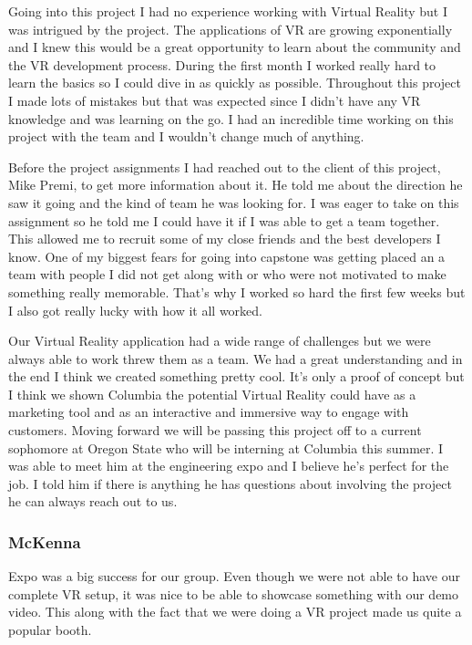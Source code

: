 \documentclass[10pt,journal,compsoc,onecolumn, draftclsnofoot]{IEEEtran}
\begin{document}
Going into this project I had no experience working with Virtual Reality but I was intrigued by the project. The applications of VR are growing exponentially and I knew this would be a great opportunity to learn about the community and the VR development process. During the first month I worked really hard to learn the basics so I could dive in as quickly as possible. Throughout this project I made lots of mistakes but that was expected since I didn't have any VR knowledge and was learning on the go. I had an incredible time working on this project with the team and I wouldn't change much of anything.

Before the project assignments I had reached out to the client of this project, Mike Premi, to get more information about it. He told me about the direction he saw it going and the kind of team he was looking for. I was eager to take on this assignment so he told me I could have it if I was able to get a team together. This allowed me to recruit some of my close friends and the best developers I know. One of my biggest fears for going into capstone was getting placed an a team with people I did not get along with or who were not motivated to make something really memorable. That's why I worked so hard the first few weeks but I also got really lucky with how it all worked.

Our Virtual Reality application had a wide range of challenges but we were always able to work threw them as a team. We had a great understanding and in the end I think we created something pretty cool. It's only a proof of concept but I think we shown Columbia the potential Virtual Reality could have as a marketing tool and as an interactive and immersive way to engage with customers. Moving forward we will be passing this project off to a current sophomore at Oregon State who will be interning at Columbia this summer. I was able to meet him at the engineering expo and I believe he's perfect for the job. I told him if there is anything he has questions about involving the project he can always reach out to us.

\subsubsection{McKenna}

Expo was a big success for our group. Even though we were not able to have our complete VR setup, it was nice to be able to showcase something with our demo video. This along with the fact that we were doing a VR project made us quite a popular booth.
\end{document}

